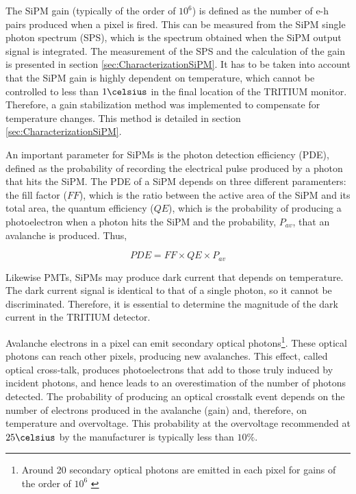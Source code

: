 The SiPM gain (typically of the order of $10^6$) is defined as the number of e-h pairs produced when a pixel is fired. This can be measured from the SiPM single photon spectrum (SPS), which is the spectrum obtained when the SiPM output signal is integrated. The measurement of the SPS and the calculation of the gain is presented in section \ref{sec:CharacterizationSiPM}. It has to be taken into account that the SiPM gain is highly dependent on temperature, which cannot be controlled to less than $1\celsius$ in the final location of the TRITIUM monitor. Therefore, a gain stabilization method was implemented to compensate for temperature changes. This method is detailed in section \ref{sec:CharacterizationSiPM}.

An important parameter for SiPMs is the photon detection efficiency (PDE), defined as the probability of recording the electrical pulse produced by a photon that hits the SiPM. The PDE of a SiPM depends on three different paramenters: the fill factor ($FF$), which is the ratio between the active area of the SiPM and its total area, the quantum efficiency ($QE$), which is the probability of producing a photoelectron when a photon hits the SiPM and the probability, $P_{av}$, that an avalanche is produced. Thus, 

\begin{equation}
PDE=FF \times QE \times P_{av}
\label{PDE_SiPM}
\end{equation}

Likewise PMTs, SiPMs may produce dark current that depends on temperature. The dark current signal is identical to that of a single photon, so it cannot be discriminated. Therefore, it is essential to determine the magnitude of the dark current in the TRITIUM detector.

Avalanche electrons in a pixel can emit secondary optical photons\footnote{Around 20 secondary optical photons are emitted in each pixel for gains of the order of $10^6$ \cite{CrosstalkProbability}}. These optical photons can reach other pixels, producing new avalanches. This effect, called optical cross-talk, produces photoelectrons that add to those truly induced by incident photons, and hence leads to an overestimation of the number of photons detected. The probability of producing an optical crosstalk event depends on the number of electrons produced in the avalanche (gain) and, therefore, on temperature and overvoltage. This probability at the overvoltage recommended at $25\celsius$ by the manufacturer is typically less than $10\%$.

